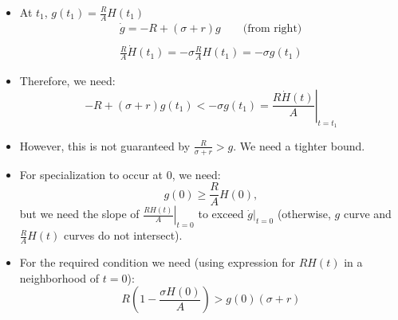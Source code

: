 \documentclass[12pt,compress,handout]{beamer}  %
\begin{document}
\begin{frame}
\begin{itemize}[<+->]
\item At $t_{1}$, $g(t_{1})=\frac{R}{A}H(t_{1})$
  \begin{gather*}
    \dot{g} = -R + (\sigma +r)g \qquad \text{(from right)} \\
    \\
    \frac{R}{A}\dot{H}(t_{1}) = -\sigma\frac{R}{A}H(t_{1}) = -\sigma
    g(t_{1})
  \end{gather*}

\item Therefore, we need:
  \begin{equation*}
    -R + (\sigma +r)g(t_{1}) < -\sigma g(t_{1}) = \left. \frac{R\dot{H}(t)}{A}
    \right|_{t=t_{1}}
  \end{equation*}
\item However, this is not guaranteed by $\frac{R}{\sigma +r}>g$. We need a
    tighter bound.
\end{itemize}
\end{frame}


\begin{frame}
\begin{itemize}[<+->]
\item For specialization to occur at $0$, we need:
  \begin{equation*}
    g(0) \geq \frac{R}{A}H(0),
  \end{equation*}
  but we need the slope of $\left. \frac{RH(t)}{A} \right|_{t=0}$ to exceed
  $\dot{g}\bigg|_{t=0}$ (otherwise, $g$ curve and $\frac{R}{A}H(t)$ curves
  do not intersect).
\\[2mm]

\item For the required condition we need (using expression for $RH(t)$ in a
    neighborhood of $t=0$):
  \begin{equation*}
    R \left( 1 -\frac{\sigma H(0)}{A} \right) > g(0)(\sigma +r)
  \end{equation*}
\end{itemize}
\end{frame}
\end{document}
